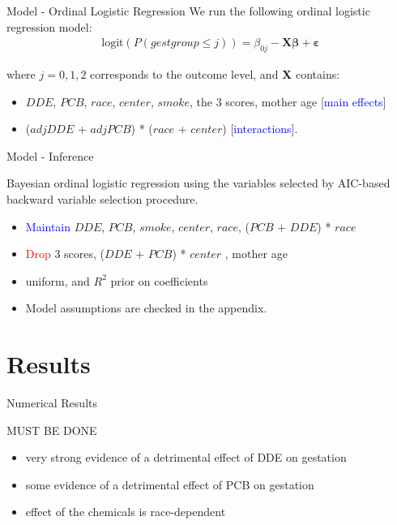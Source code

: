 \documentclass{beamer}
\begin{document}
\begin{frame}{Model - Ordinal Logistic Regression}
We run the following ordinal logistic regression model:
\begin{align*}
\textrm{logit}(P(gestgroup \leq j)) = \beta_{0j} - \mathbf{X} \boldsymbol{\beta} + \boldsymbol{\varepsilon}
\end{align*}

where $j = 0,1,2$ corresponds to the outcome level, and \textbf{X} contains:
\begin{itemize}
	\item $DDE$, $PCB$, $race$, $center$, $smoke$, the 3 scores, mother age [\textcolor{blue}{main effects}]
	\item ($adjDDE$ + $adjPCB$) * ($race$ + $center$) [\textcolor{blue}{interactions}].
\end{itemize}

\end{frame}


\begin{frame}{Model - Inference}

Bayesian ordinal logistic regression using the variables selected by AIC-based backward variable selection procedure.
\begin{itemize}
	\item \textcolor{blue}{Maintain} $DDE$, $PCB$, $smoke$, $center$, $race$, ($PCB$ + $DDE$) * $race$
	\item \textcolor{red}{Drop} 3 scores, ($DDE$ + $PCB$) * $center$ , mother age
	\item uniform, and $R^2$ prior on coefficients
	\item Model assumptions are checked in the appendix.
\end{itemize}


\end{frame}




\section{Results}
\begin{frame}{Numerical Results}

MUST BE DONE

\begin{itemize}
	\item very strong evidence of a detrimental effect of DDE on gestation 
	\item some evidence of a detrimental effect of PCB on gestation
	\item effect of the chemicals is race-dependent
\end{itemize}
\end{frame}
\end{document}

